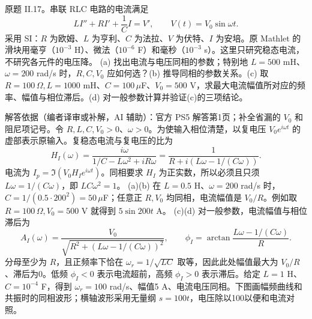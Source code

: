 \begin{exercise}\label{cw:ps5-II-17}
原题 II.17。串联 RLC 电路的电流满足
\[
 LI''+RI'+\frac1C I=V',\qquad V(t)=V_0\sin\omega t.
\]
采用 SI：$R$ 为欧姆、$L$ 为亨利、$C$ 为法拉、$V$ 为伏特、$I$ 为安培。原 Mathlet 的滑块用毫亨（$10^{-3}$ H）、微法（$10^{-6}$ F）和毫秒（$10^{-3}$ s）。这里只研究稳态电流，不研究各元件的电压降。
(a) 找出电流与电压同相的参数；特别地 $L=500$ mH、$\omega=200$ rad/s 时，$R,C,V_0$ 应如何选？(b) 推导同相的参数关系。(c) 取 $R=100\,\Omega,L=1000$ mH、$C=100\,\mu$F、$V_0=500$ V，求最大电流幅值所对应的频率、幅值与相位滞后。(d) 对一般参数计算并验证(c)的三项结论。
\end{exercise}
\begin{solution}
解答依据（编者译审或补解，AI 辅助）：官方 PS5 解答第1页；补全省漏的 $V_0$ 和阻尼项记号。令 $R,L,C,V_0>0$、$\omega>0$。为使输入相位清楚，以复电压 $V_0e^{i\omega t}$ 的虚部表示原输入。复稳态电流与复电压的比为
\[
 H_I(\omega)=\frac{i\omega}{1/C-L\omega^2+iR\omega}
 =\frac1{R+i(L\omega-1/(C\omega))}.
\]
电流为 $I_p=\Im(V_0H_Ie^{i\omega t})$。同相要求 $H_I$ 为正实数，所以必须且只须 $L\omega=1/(C\omega)$，即 $LC\omega^2=1$。
(a)(b) 在 $L=0.5$ H、$\omega=200$ rad/s 时，$C=1/(0.5\cdot200^2)=50\,\mu$F；任意正 $R,V_0$ 均同相，电流幅值是 $V_0/R$。例如取 $R=100\,\Omega,V_0=500$ V 就得到 $5\sin200t$ A。
(c)(d) 对一般参数，电流幅值与相位滞后为
\[
 A_I(\omega)=\frac{V_0}{\sqrt{R^2+(L\omega-1/(C\omega))^2}},\qquad
 \phi_I=\arctan\frac{L\omega-1/(C\omega)}R.
\]
分母至少为 $R$，且正频率下恰在 $\omega_r=1/\sqrt{LC}$ 取等，因此此处幅值最大为 $V_0/R$、滞后为0。低频 $\phi_I<0$ 表示电流超前，高频 $\phi_I>0$ 表示滞后。给定 $L=1$ H、$C=10^{-4}$ F，得到 $\omega_r=100$ rad/s、幅值5 A、电流电压同相。下图画幅频曲线和共振时的同相波形；横轴波形采用无量纲 $s=100t$，电压除以100以便和电流对照。
\begin{center}\end{center}
\end{solution}
